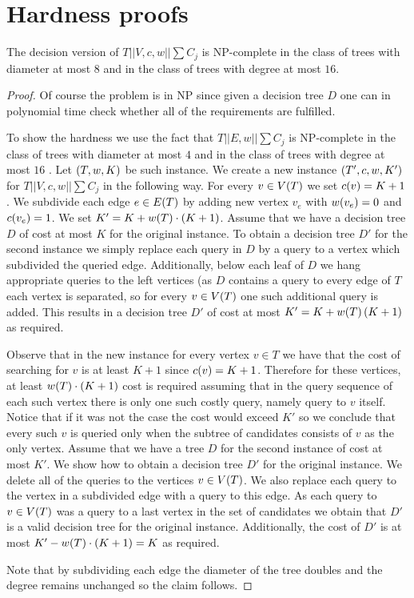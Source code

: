 \chapter{Hardness proofs}
\begin{theorem}
    The decision version of $T||V,c,w||\sum C_j$ is NP-complete in the class of trees with diameter at most $8$ and in the class of trees with degree at most $16$.
    \begin{proof}
        Of course the problem is in NP since given a decision tree $D$ one can in polynomial time check whether all of the requirements are fulfilled.

        To show the hardness we use the fact that $T||E, w||\sum C_j$ is NP-complete in the class of trees with diameter at most $4$ and in the class of trees with degree at most $16$ \cite{Jacobs2010OnTheComplexSearchInTsAvg}. Let $\mathopen{}\left( T, w, K \right)$ be such instance. We create a new instance $\mathopen{}\left( T', c, w, K' \right)$ for $T||V,c,w||\sum C_j$ in the following way. For every $v\in V\mathopen{}\left( T \right)$ we set $c\mathopen{}\left( v \right)=K+1$. We subdivide each edge $e\in E\mathopen{}\left( T \right)$ by adding new vertex $v_e$ with $w\mathopen{}\left( v_e \right)=0$ and $c\mathopen{}\left( v_e \right)=1$. We set $K'=K+w\mathopen{}\left( T \right)\cdot\mathopen{}\left( K+1 \right)$. 
        Assume that we have a decision tree $D$ of cost at most $K$ for the original instance. To obtain a decision tree $D'$ for the second instance we simply replace each query in $D$ by a query to a vertex which subdivided the queried edge. Additionally, below each leaf of $D$ we hang appropriate queries to the left vertices (as $D$ contains a query to every edge of $T$ each vertex is separated, so for every $v\in V\mathopen{}\left( T \right)$ one such additional query is added. This results in a decision tree $D'$ of cost at most $K'=K+w\mathopen{}\left( T \right)\mathopen{}\left( K+1 \right)$ as required.

        
        Observe that in the new instance for every vertex $v\in T$ we have that the cost of searching for $v$ is at least $K+1$ since $c\mathopen{}\left( v \right)=K+1$. Therefore for these vertices, at least $w\mathopen{}\left( T \right)\cdot\mathopen{}\left( K+1 \right)$ cost is required assuming that in the query sequence of each such vertex there is only one such costly query, namely query to $v$ itself. Notice that if it was not the case the cost would exceed $K'$ so we conclude that every such $v$ is queried only when the subtree of candidates consists of $v$ as the only vertex. Assume that we have a tree $D$ for the second instance of cost at most $K'$. We show how to obtain a decision tree $D'$ for the original instance. We delete all of the queries to the vertices $v\in V\mathopen{}\left( T \right)$. We also replace each query to the vertex in a subdivided edge with a query to this edge. As each query to $v\in V\mathopen{}\left( T \right)$ was a query to a last vertex in the set of candidates we obtain that $D'$ is a valid decision tree for the original instance. Additionally, the cost of $D'$ is at most $K'-w\mathopen{}\left( T \right)\cdot\mathopen{}\left( K+1 \right) = K$ as required.

        Note that by subdividing each edge the diameter of the tree doubles and the degree remains unchanged so the claim follows.
    \end{proof}
\end{theorem}
